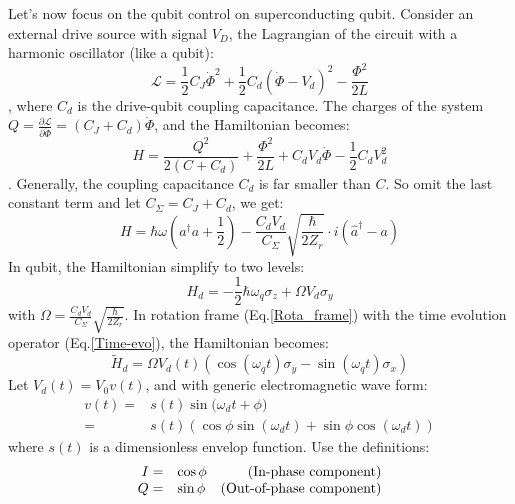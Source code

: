 Let's now focus on the qubit control on superconducting qubit. Consider an external drive source with signal $V_D$, the Lagrangian of the circuit with a harmonic oscillator (like a qubit):
\begin{equation}
    \mathcal{L} = \frac{1}{2}C_J\dot{\Phi}^2 + \frac{1}{2}C_d(\dot{\Phi} - V_d)^2 - \frac{\Phi^2}{2L}
\end{equation}
, where $C_d$ is the drive-qubit coupling capacitance. The charges of the system $Q = \frac{\partial \mathcal{L}}{\partial \dot{\Phi}} = (C_J+C_d)\dot{\Phi}$, and the Hamiltonian becomes:
\begin{equation}
    H = \frac{Q^2}{2(C+C_d)} + \frac{\Phi^2}{2L} + C_d V_d\dot{\Phi} - \frac{1}{2}C_d V_d^2
\end{equation}
. Generally, the coupling capacitance $C_d$ is far smaller than $C$. So omit the last constant term and let $C_\Sigma = C_J + C_d$, we get:
\begin{equation}
    H = \hbar\omega(a^\dagger a + \frac{1}{2}) - \frac{C_dV_d}{C_\Sigma}\sqrt{\frac{\hbar}{2Z_r}}\cdot i(\hat{a}^\dagger - a)
\end{equation}
In qubit, the Hamiltonian simplify to two levels:
\begin{equation}
    H_d = -\frac{1}{2}\hbar \omega_q \sigma_z + \Omega V_d\sigma_y
\end{equation}
with $\Omega=\frac{C_dV_d}{C_\Sigma}\sqrt{\frac{\hbar}{2Z_r}}$. In rotation frame (Eq.\ref{Rota_frame}) with the time evolution operator (Eq.\ref{Time-evo}), the Hamiltonian becomes:
\begin{equation}
    \tilde{H}_d = \Omega V_d(t) (\cos{(\omega_q t)}\sigma_y - \sin{(\omega_qt)}\sigma_x)
\end{equation}
Let $V_d(t) = V_0v(t)$, and with generic electromagnetic wave form:
\begin{equation}
    \begin{array}{rl}
         v(t) =& s(t)\sin{(\omega_dt+\phi})  \\
         =& s(t)(\cos{\phi}\sin{(\omega_dt)}+\sin{\phi}\cos{(\omega_dt)})
    \end{array}
\end{equation}
where $s(t)$ is a dimensionless envelop function. Use the definitions:
\begin{equation}
\begin{array}{rlr}
    I =&\cos{\phi} \hfill &\text{(In-phase component)}  \\
    Q =&\sin{\phi} \hfill &\text{(Out-of-phase component)}
\end{array}
\end{equation}
